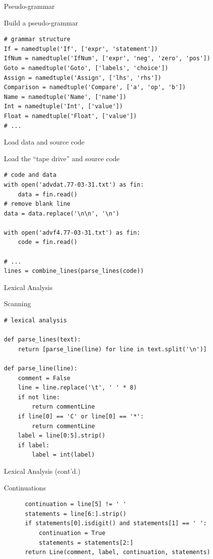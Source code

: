 \documentclass{beamer}
\def\py{
  \lstset{
     language=Python,
     extendedchars=true,
     basicstyle=\footnotesize\ttfamily,
     showstringspaces=false,
     showspaces=false,
     numbersep=9pt,
     tabsize=2,
     breaklines=true,
     showtabs=false,
     captionpos=b
  }
}
\begin{document}
\begin{frame}[fragile]{Pseudo-grammar}

\begin{block}{Build a pseudo-grammar}
\py
\begin{lstlisting}
# grammar structure
If = namedtuple('If', ['expr', 'statement'])
IfNum = namedtuple('IfNum', ['expr', 'neg', 'zero', 'pos'])
Goto = namedtuple('Goto', ['labels', 'choice'])
Assign = namedtuple('Assign', ['lhs', 'rhs'])
Comparison = namedtuple('Compare', ['a', 'op', 'b'])
Name = namedtuple('Name', ['name'])
Int = namedtuple('Int', ['value'])
Float = namedtuple('Float', ['value'])
# ...
\end{lstlisting}
\end{block}
\end{frame}

\begin{frame}[fragile]{Load data and source code}

\begin{block}{Load the ``tape drive'' and source code}
\py
\begin{lstlisting}
# code and data
with open('advdat.77-03-31.txt') as fin:
    data = fin.read()
# remove blank line
data = data.replace('\n\n', '\n')

with open('advf4.77-03-31.txt') as fin:
    code = fin.read()

# ...
lines = combine_lines(parse_lines(code))
\end{lstlisting}
\end{block}
\end{frame}

\begin{frame}[fragile]{Lexical Analysis}

\begin{block}{Scanning}
\py
\begin{lstlisting}
# lexical analysis

def parse_lines(text):
    return [parse_line(line) for line in text.split('\n')]

def parse_line(line):
    comment = False
    line = line.replace('\t', ' ' * 8)
    if not line:
        return commentLine
    if line[0] == 'C' or line[0] == '*':
        return commentLine
    label = line[0:5].strip()
    if label:
        label = int(label)
\end{lstlisting}
\end{block}
\end{frame}

\begin{frame}[fragile]{Lexical Analysis (cont'd.)}

\begin{block}{Continuations}
\py
\begin{lstlisting}
      continuation = line[5] != ' '
      statements = line[6:].strip()
      if statements[0].isdigit() and statements[1] == ' ':
          continuation = True
          statements = statements[2:]
      return Line(comment, label, continuation, statements)
\end{lstlisting}
\end{block}
\end{frame}
\end{document}
